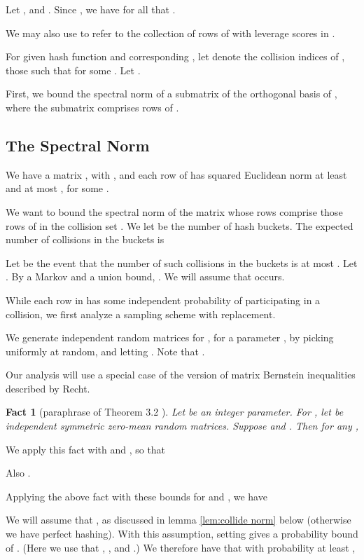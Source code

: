 \documentclass{sig-alternate}
\newtheorem{fact}[theorem]{Fact}
\begin{document}
Let , and .
Since , we have for all  that .

We may also use  to refer to the collection of rows of 
with leverage scores in .

For given hash function  and corresponding ,
let  denote the collision indices of ,
those  such that  for some .
Let .

First, we bound the spectral norm of a submatrix of the orthogonal basis  of ,
where the submatrix comprises rows of .

\subsection{The Spectral Norm}\label{subsec:spectral}
We have a matrix , with , and
each row of  has squared Euclidean norm at least 
and at most , for some .

We want to bound the spectral norm of the matrix  whose
rows comprise those rows of  in the collision set .
We let 
be the number of hash buckets. 
The expected number of collisions in the  buckets is

Let  be the event that the number  of such collisions in the  buckets is at most .
Let . By a 
Markov and a union bound, . We will assume that 
occurs.

While each row in  has some independent probability 
of participating in a collision, we first analyze a sampling scheme with
replacement.

We generate independent
random matrices  for , for a parameter ,
by picking  uniformly at random, and letting
. Note that .






Our analysis will use a special case of the version of matrix Bernstein inequalities
described by Recht.

\begin{fact}[paraphrase of Theorem 3.2 \cite{Recht}]
Let  be an integer parameter. 
For , let  be independent symmetric zero-mean random matrices.
Suppose
 and .
Then for any ,

\end{fact}

We apply this fact with  and ,
so that

Also
.

Applying the above fact with these bounds for  and ,
we have

We will assume that , as discussed in lemma \ref{lem:collide norm} 
below (otherwise we have perfect hashing). With this
assumption, setting  gives
a probability bound of .
(Here we use that , , and
.)
We therefore have that with probability at least ,
\end{document}
